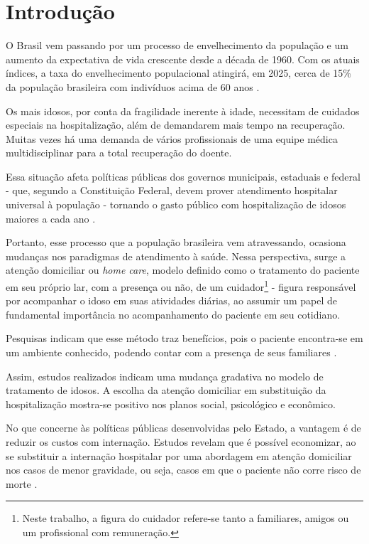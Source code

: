 \chapter{Introdução}\label{cap:introducao}

O Brasil vem passando por um processo de envelhecimento da população e
um aumento da expectativa de vida crescente desde a década de 1960. 
Com os atuais índices, a taxa do envelhecimento populacional atingirá, 
em 2025, cerca de 15\% da população brasileira com indivíduos acima 
de 60 anos \cite{gonccalves2006perfil}. 

Os mais idosos, por conta da fragilidade inerente à idade, necessitam de 
cuidados especiais na hospitalização, além de demandarem mais tempo na 
recuperação. Muitas vezes há uma demanda de vários profissionais de uma equipe 
médica multidisciplinar para a total recuperação do doente.

Essa situação afeta políticas públicas dos governos municipais, estaduais e
federal - que, segundo a Constituição Federal, devem prover atendimento
hospitalar universal à população - tornando o gasto público com hospitalização
de idosos maiores a cada ano \cite{da2013gastos}.

Portanto, esse processo que a população brasileira vem atravessando, ocasiona
mudanças  nos paradigmas de atendimento à saúde. Nessa perspectiva, surge a
atenção domiciliar ou \textit{home care}, modelo definido como o tratamento do
paciente em seu próprio lar, com a presença ou não, de um
cuidador\footnote{Neste trabalho, a figura do cuidador refere-se tanto a
familiares, amigos ou um profissional com remuneração.} - figura responsável por
acompanhar o idoso em suas atividades diárias, ao assumir um papel de
fundamental importância no acompanhamento do paciente em seu cotidiano.

Pesquisas indicam que esse método traz benefícios, pois o  paciente encontra-se
em um ambiente conhecido, podendo contar com a presença de seus familiares
\cite{hermann2007atendimento, day2010beneficios}.

Assim, estudos realizados indicam uma mudança gradativa no modelo de tratamento
de idosos. A escolha da atenção domiciliar em substituição da hospitalização 
mostra-se positivo nos planos social, psicológico e econômico. 

No que concerne às políticas públicas desenvolvidas pelo Estado,  a vantagem é
de reduzir os custos com internação. Estudos revelam  que é possível economizar,
ao se substituir a internação hospitalar por uma  abordagem em atenção 
domiciliar nos casos de menor gravidade,  ou seja, casos em que o paciente não 
corre risco de morte \cite{bourdette1993health}.  

